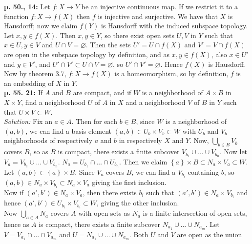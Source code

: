 \documentclass[a4paper]{article}
\begin{document}
\textbf{p. 50., 14:} Let $f  \colon X \to Y$ be an injective continuous map.
If we restrict it to a function  $f  \colon X \to f(X)$ then
$f$ is injective and surjective. We have that $X$ is Hausdorff; now we claim
$f(Y)$ is Hausdorff with the induced subspace topology.\\
Let $x,y \in f(X)$. Then $x,y \in Y$, so there exist open sets
$U,V$ in $Y$ such that $x \in U, y \in V$ and $U \cap V = \varnothing$.
Then the sets $U' = U \cap f(X)$ and $V' = V \cap f(X)$ are open in
the subspace topology by definition, and as $x,y \in f(X)$, also
$x \in U'$ and $y \in V'$, and 
$U' \cap V' \subset U \cap V = \varnothing$, so $U' \cap V' = \varnothing$.
Hence
$f(X)$ is Hausdorff. Now by theorem 3.7, 
$f  \colon X \to f(X)$ is a homeomorphism, so by definition, 
$f $ is an embedding of $X$ in $Y$.\\
\linebreak
\textbf{p. 55. 21:} If $A$ and $B$ are compact, and if $W$ is a neighborhood of
$A \times B$ in $X \times Y$, find a neighborhood $U$ of $A$ in $X$ and
a neighborhood $V$ of $B$ in $Y$ such that
$U \times V \subset W$.\\
\linebreak
\textit{Solution:} Fix an $a \in A$. Then
for each $b \in B$, since $W$ is a neighborhood of $(a,b)$, we can
find a basis element $(a,b) \in U_b \times V_b \subset W$ with
$U_b$ and $V_b$ neighborhoods of respectively $a$ and $b$ in respectively $X$
and $Y$. Now, $\bigcup_{b \in B} V_b$ covers $B$, so as $B$ is compact, there
exists a finite subcover $V_{b_1} \cup \ldots \cup  V_{b_n}$. Now let
$V_a  = V_{b_1} \cup \ldots \cup  V_{b_n}$.
$N_a = U_{b_1} \cap \ldots \cap U_{b_n}$. Then we claim
$\left\{ a \right\} \times B \subset N_a \times V_a
\subset W$. Let $(a,b) \in \left\{ a \right\} \times B$. 
Since $V_a$ covers $B$, we can find a $V_{b_i}$ containing $b$, so
$(a,b) \in N_a \times V_{b_i} 
\subset N_a \times V_a$ giving the first inclusion.\\
Now if $(a',b') \in N_a \times V_a$, then
there exists $b_i$ such that $(a',b') \in N_a \times V_{b_i}$ and hence
$(a',b') \in U_{b_i} \times V_{b_i} \subset W$, giving the
other inclusion.\\
\linebreak
Now $\bigcup_{a \in A}  N_a$ covers $A$ with open sets as $N_a$ is a finite
intersection of open sets, hence as $A$ is compact, there exists a finite
subcover
$N_{a_1} \cup \ldots \cup N_{a_m}$. Let $V = V_{a_1} \cap \ldots \cap V_{a_m}$
and
$U = N_{a_1} \cup \ldots \cup N_{a_m}$. Both $U$ and $V$ are open as the union
\end{document}
